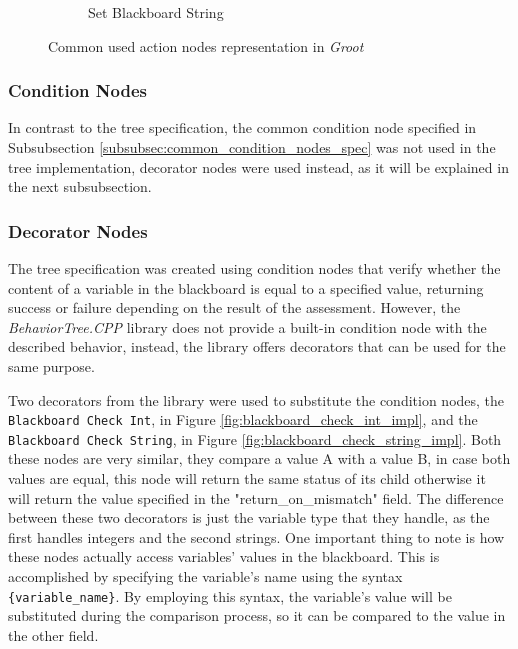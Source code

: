 \begin{figure}[!h]
\begin{subfigure}[b]{.32\linewidth}
        \caption{Set Blackboard String}
        \label{fig:set_blackboard_string_impl}
    \end{subfigure}
    \caption{Common used action nodes representation in \textit{Groot}}
    \label{fig:common_action_node_impl}
\end{figure}

\subsubsection{Condition Nodes}

In contrast to the tree specification, the common condition node specified in Subsubsection \ref{subsubsec:common_condition_nodes_spec} was not used in the tree implementation, decorator nodes were used instead, as it will be explained in the next subsubsection.

\subsubsection{Decorator Nodes}
\label{subsubsec:decator_nodes_impl}

The tree specification was created using condition nodes that verify whether the content of a variable in the blackboard is equal to a specified value, returning success or failure depending on the result of the assessment. However, the \textit{BehaviorTree.CPP} library does not provide a built-in condition node with the described behavior, instead, the library offers decorators that can be used for the same purpose.

Two decorators from the library were used to substitute the condition nodes, the \texttt{Blackboard Check Int}, in Figure \ref{fig:blackboard_check_int_impl}, and the \texttt{Blackboard Check String}, in Figure \ref{fig:blackboard_check_string_impl}. Both these nodes are very similar, they compare a value A with a value B, in case both values are equal, this node will return the same status of its child otherwise it will return the value specified in the "return\_on\_mismatch" field. The difference between these two decorators is just the variable type that they handle, as the first handles integers and the second strings. One important thing to note is how these nodes actually access variables' values in the blackboard. This is accomplished by specifying the variable's name using the syntax \texttt{\{variable\_name\}}. By employing this syntax, the variable's value will be substituted during the comparison process, so it can be compared to the value in the other field.

